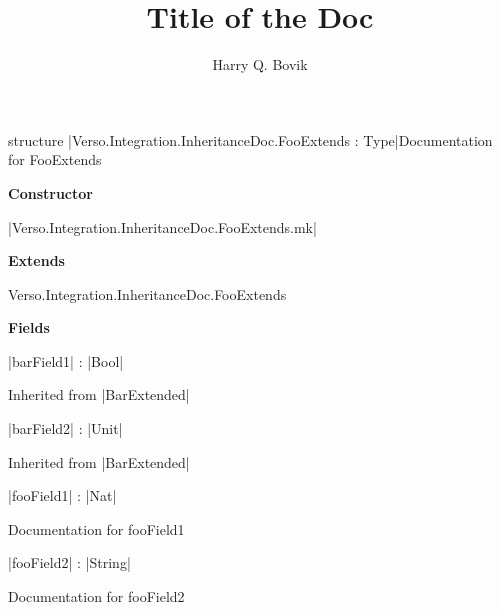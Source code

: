 \documentclass[oneside]{memoir}
\title{\sffamily Title of the Doc}
\author{\sffamily Harry Q. Bovik}
\date{\sffamily }
\begin{document}
\frontmatter

\begin{titlingpage}
\maketitle
\end{titlingpage}

\tableofcontents


\cleardoublepage
\begin{docstringBox}{structure}
\LeanVerb|Verso.\allowbreak{}Integration.\allowbreak{}Inheritance\-Doc.\allowbreak{}Foo\-Extends : Type|\tcblower Documentation for FooExtends

\par\noindent\textbf{Constructor}\par \par\noindent \LeanVerb|Verso.\allowbreak{}Integration.\allowbreak{}Inheritance\-Doc.\allowbreak{}Foo\-Extends.\allowbreak{}mk|



\par\noindent\textbf{Extends}\par Verso.Integration.InheritanceDoc.FooExtends



\par\noindent\textbf{Fields}\par \par\noindent \LeanVerb|bar\-Field1| : \LeanVerb|Bool|\par Inherited from \LeanVerb|Bar\-Extended|

\par\noindent \LeanVerb|bar\-Field2| : \LeanVerb|Unit|\par Inherited from \LeanVerb|Bar\-Extended|

\par\noindent \LeanVerb|foo\-Field1| : \LeanVerb|Nat|\par Documentation for fooField1



\par\noindent \LeanVerb|foo\-Field2| : \LeanVerb|String|\par Documentation for fooField2






\end{docstringBox}




\mainmatter
\end{document}
